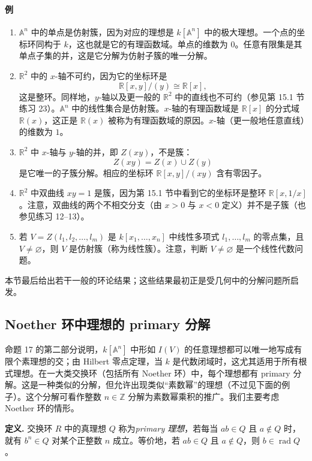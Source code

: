 \paragraph{例}
\begin{enumerate}[label=(\arabic*)]
	\item $\mathbb A^n$ 中的单点是仿射簇，因为对应的理想是 $k[\mathbb A^n]$ 中的极大理想。一个点的坐标环同构于 $k$，这也就是它的有理函数域。单点的维数为 $0$。任意有限集是其单点子集的并，这是它分解为仿射子簇的唯一分解。
	\item $\mathbb R^2$ 中的 $x$-轴不可约，因为它的坐标环是
	\[
	\mathbb R[x,y]/(y)\cong\mathbb R[x],
	\]
	这是整环。同样地，$y$-轴以及更一般的 $\mathbb R^2$ 中的直线也不可约（参见第 15.1 节练习 23）。$\mathbb A^n$ 中的线性集合是仿射簇。$x$-轴的有理函数域是 $\mathbb R[x]$ 的分式域 $\mathbb R(x)$，这正是 $\mathbb R(x)$ 被称为有理函数域的原因。$x$-轴（更一般地任意直线）的维数为 $1$。
	\item $\mathbb R^2$ 中 $x$-轴与 $y$-轴的并，即 $Z(xy)$，不是簇：
	\[
	Z(xy)=Z(x)\cup Z(y)
	\]
	是它唯一的子簇分解。相应的坐标环 $\mathbb R[x,y]/(xy)$ 含有零因子。
	\item $\mathbb R^2$ 中双曲线 $xy=1$ 是簇，因为第 15.1 节中看到它的坐标环是整环 $\mathbb R[x,1/x]$。注意，双曲线的两个不相交分支（由 $x>0$ 与 $x<0$ 定义）并不是子簇（也参见练习 12--13）。
	\item 若 $V=Z(l_1,l_2,
	\ldots,l_m)$ 是 $k[x_1,
	\ldots,x_n]$ 中线性多项式 $l_1,
	\ldots,l_m$ 的零点集，且 $V\ne\varnothing$，则 $V$ 是仿射簇（称为线性簇）。注意，判断 $V\ne\varnothing$ 是一个线性代数问题。
\end{enumerate}

本节最后给出若干一般的环论结果；这些结果最初正是受几何中的分解问题所启发。

\subsection*{Noether 环中理想的 primary 分解}

命题 17 的第二部分说明，$k[\mathbb A^n]$ 中形如 $I(V)$ 的任意理想都可以唯一地写成有限个素理想的交；由 Hilbert 零点定理，当 $k$ 是代数闭域时，这尤其适用于所有根式理想。在一大类交换环（包括所有 Noether 环）中，每个理想都有 primary 分解。这是一种类似的分解，但允许出现类似“素数幂”的理想（不过见下面的例子）。这个分解可看作整数 $n\in\mathbb Z$ 分解为素数幂乘积的推广。我们主要考虑 Noether 环的情形。

\noindent\textbf{定义.} 交换环 $R$ 中的真理想 $Q$ 称为\emph{primary 理想}，若每当 $ab\in Q$ 且 $a\notin Q$ 时，就有 $b^n\in Q$ 对某个正整数 $n$ 成立。等价地，若 $ab\in Q$ 且 $a\notin Q$，则 $b\in\operatorname{rad}Q$。

